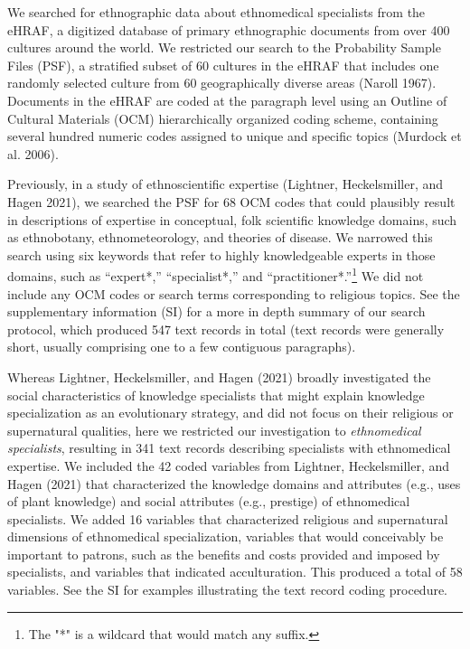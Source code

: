 \documentclass[
  11pt,
]{article}
\begin{document}
We searched for ethnographic data about ethnomedical specialists from the eHRAF, a digitized database of primary ethnographic documents from over 400 cultures around the world. We restricted our search to the Probability Sample Files (PSF), a stratified subset of 60 cultures in the eHRAF that includes one randomly selected culture from 60 geographically diverse areas (Naroll 1967). Documents in the eHRAF are coded at the paragraph level using an Outline of Cultural Materials (OCM) hierarchically organized coding scheme, containing several hundred numeric codes assigned to unique and specific topics (Murdock et al. 2006).

Previously, in a study of ethnoscientific expertise (Lightner, Heckelsmiller, and Hagen 2021), we searched the PSF for 68 OCM codes that could plausibly result in descriptions of expertise in conceptual, folk scientific knowledge domains, such as ethnobotany, ethnometeorology, and theories of disease. We narrowed this search using six keywords that refer to highly knowledgeable experts in those domains, such as ``expert*,'' ``specialist*,'' and ``practitioner*.''\footnote{The "*" is a wildcard that would match any suffix.} We did not include any OCM codes or search terms corresponding to religious topics. See the supplementary information (SI) for a more in depth summary of our search protocol, which produced 547 text records in total (text records were generally short, usually comprising one to a few contiguous paragraphs).

Whereas Lightner, Heckelsmiller, and Hagen (2021) broadly investigated the social characteristics of knowledge specialists that might explain knowledge specialization as an evolutionary strategy, and did not focus on their religious or supernatural qualities, here we restricted our investigation to \emph{ethnomedical specialists}, resulting in 341 text records describing specialists with ethnomedical expertise. We included the 42 coded variables from Lightner, Heckelsmiller, and Hagen (2021) that characterized the knowledge domains and attributes (e.g., uses of plant knowledge) and social attributes (e.g., prestige) of ethnomedical specialists. We added 16 variables that characterized religious and supernatural dimensions of ethnomedical specialization, variables that would conceivably be important to patrons, such as the benefits and costs provided and imposed by specialists, and variables that indicated acculturation. This produced a total of 58 variables. See the SI for examples illustrating the text record coding procedure.
\end{document}
